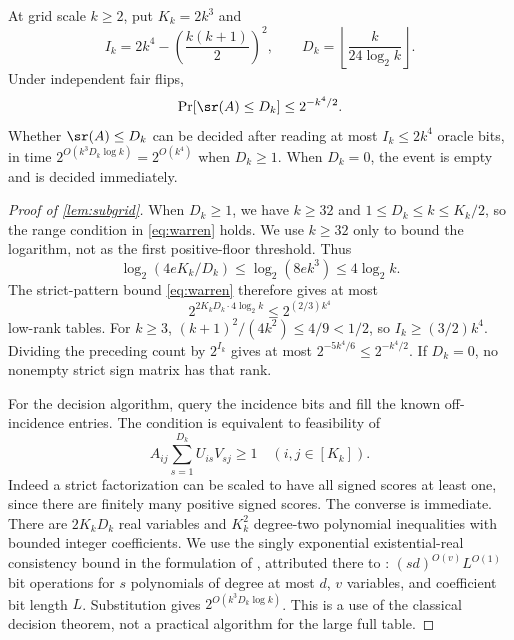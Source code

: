 \begin{lemma}\label{lem:subgrid}
At grid scale $k\ge2$, put $K_k=2k^3$ and
\[
 I_k=2k^4-\left(\frac{k(k+1)}2\right)^2,
 \qquad D_k=\left\lfloor\frac{k}{24\log_2 k}\right\rfloor.
\]
Under independent fair flips,
\[
 \Pr[\sr(A)\le D_k]\le2^{-k^4/2}.
\]
Whether $\sr(A)\le D_k$ can be decided after reading at most $I_k\le2k^4$ oracle bits, in time $2^{O(k^3D_k\log k)}=2^{O(k^4)}$ when $D_k\ge1$. When $D_k=0$, the event is empty and is decided immediately.
\end{lemma}

\begin{proof}[Proof of \cref{lem:subgrid}]
When $D_k\ge1$, we have $k\ge32$ and $1\le D_k\le k\le K_k/2$, so the range condition in \eqref{eq:warren} holds. We use $k\ge32$ only to bound the logarithm, not as the first positive-floor threshold. Thus
\[
 \log_2(4eK_k/D_k)\le\log_2(8e k^3)\le4\log_2k.
\]
The strict-pattern bound \eqref{eq:warren} therefore gives at most
\[
 2^{2K_kD_k\cdot4\log_2k}\le2^{(2/3)k^4}
\]
low-rank tables. For $k\ge3$, $(k+1)^2/(4k^2)\le4/9<1/2$, so $I_k\ge(3/2)k^4$. Dividing the preceding count by $2^{I_k}$ gives at most $2^{-5k^4/6}\le2^{-k^4/2}$. If $D_k=0$, no nonempty strict sign matrix has that rank.

For the decision algorithm, query the incidence bits and fill the known off-incidence entries. The condition is equivalent to feasibility of
\[
 A_{ij}\sum_{s=1}^{D_k}U_{is}V_{sj}\ge1\quad(i,j\in[K_k]).
\]
Indeed a strict factorization can be scaled to have all signed scores at least one, since there are finitely many positive signed scores. The converse is immediate. There are $2K_kD_k$ real variables and $K_k^2$ degree-two polynomial inequalities with bounded integer coefficients. We use the singly exponential existential-real consistency bound in the formulation of \citet{Vorobjov21}, attributed there to \citet{Renegar92}: $(sd)^{O(v)}L^{O(1)}$ bit operations for $s$ polynomials of degree at most $d$, $v$ variables, and coefficient bit length $L$. Substitution gives $2^{O(k^3D_k\log k)}$. This is a use of the classical decision theorem, not a practical algorithm for the large full table.
\end{proof}
